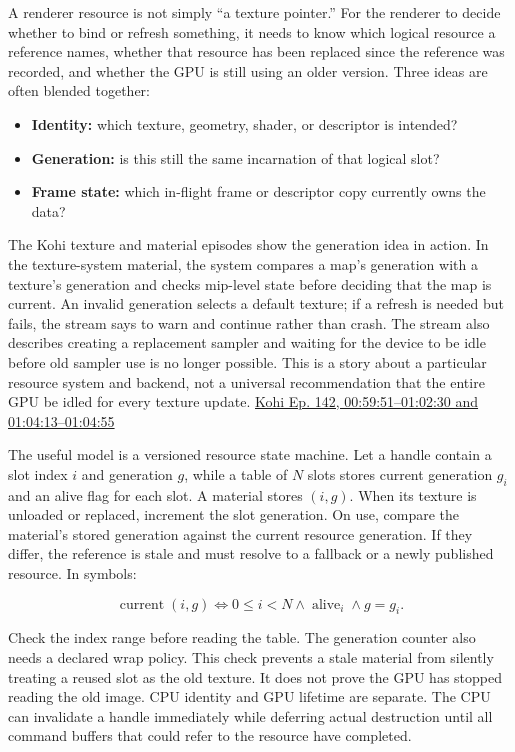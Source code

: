 \hypertarget{06-engine-ii-ch041-a-gpu-resource-needs-identity-version-and-a-safe-update-point}{}

A renderer resource is not simply ``a texture pointer.'' For the renderer to decide whether to bind or refresh something, it needs to know which logical resource a reference names, whether that resource has been replaced since the reference was recorded, and whether the GPU is still using an older version. Three ideas are often blended together:

\begin{itemize}
\tightlist
\item
  \textbf{Identity:} which texture, geometry, shader, or descriptor is intended?
\item
  \textbf{Generation:} is this still the same incarnation of that logical slot?
\item
  \textbf{Frame state:} which in-flight frame or descriptor copy currently owns the data?
\end{itemize}

The Kohi texture and material episodes show the generation idea in action. In the texture-system material, the system compares a map's generation with a texture's generation and checks mip-level state before deciding that the map is current. An invalid generation selects a default texture; if a refresh is needed but fails, the stream says to warn and continue rather than crash. The stream also describes creating a replacement sampler and waiting for the device to be idle before old sampler use is no longer possible. This is a story about a particular resource system and backend, not a universal recommendation that the entire GPU be idled for every texture update. \href{https://www.youtube.com/watch?v=xb23Y9o7tP4&t=59m51s}{Kohi Ep. 142, 00:59:51--01:02:30 and 01:04:13--01:04:55}

The useful model is a versioned resource state machine. Let a handle contain a slot index \(i\) and generation \(g\), while a table of \(N\) slots stores current generation \(g_i\) and an alive flag for each slot. A material stores \((i,g)\). When its texture is unloaded or replaced, increment the slot generation. On use, compare the material's stored generation against the current resource generation. If they differ, the reference is stale and must resolve to a fallback or a newly published resource. In symbols:

\[\operatorname{current}(i,g) \iff 0\le i<N \land \operatorname{alive}_i \land g=g_i.\]

Check the index range before reading the table. The generation counter also needs a declared wrap policy. This check prevents a stale material from silently treating a reused slot as the old texture. It does not prove the GPU has stopped reading the old image. CPU identity and GPU lifetime are separate. The CPU can invalidate a handle immediately while deferring actual destruction until all command buffers that could refer to the resource have completed.

